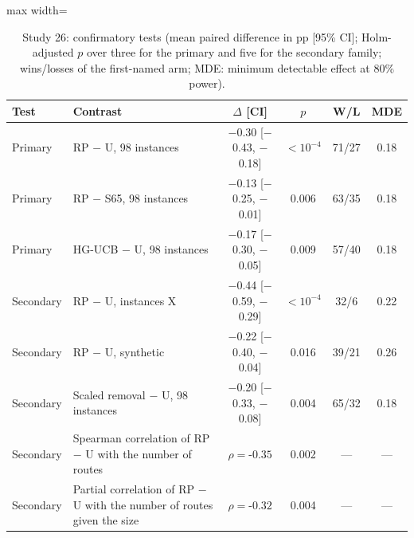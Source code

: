 \begin{table}[t]
\caption{Study 26: confirmatory tests (mean paired difference in pp [95\% CI]; Holm-adjusted $p$ over three for the primary and five for the secondary family; wins/losses of the first-named arm; MDE: minimum detectable effect at 80\% power).}\label{tab:s26f}
\centering
\small
\begin{adjustbox}{max width=\linewidth}
\begin{tabular}{llcccc}
\toprule
Test & Contrast & $\Delta$ [CI] & $p$ & W/L & MDE \\
\midrule
Primary & RP $-$ U, 98 instances & $-$0.30 [$-$0.43, $-$0.18] & \ensuremath{<10^{-4}} & 71/27 & 0.18 \\
Primary & RP $-$ S65, 98 instances & $-$0.13 [$-$0.25, $-$0.01] & 0.006 & 63/35 & 0.18 \\
Primary & HG-UCB $-$ U, 98 instances & $-$0.17 [$-$0.30, $-$0.05] & 0.009 & 57/40 & 0.18 \\
Secondary & RP $-$ U, instances X & $-$0.44 [$-$0.59, $-$0.29] & \ensuremath{<10^{-4}} & 32/6 & 0.22 \\
Secondary & RP $-$ U, synthetic & $-$0.22 [$-$0.40, $-$0.04] & 0.016 & 39/21 & 0.26 \\
Secondary & Scaled removal $-$ U, 98 instances & $-$0.20 [$-$0.33, $-$0.08] & 0.004 & 65/32 & 0.18 \\
Secondary & Spearman correlation of RP $-$ U with the number of routes & $\rho=$-$0.35$ & 0.002 & --- & --- \\
Secondary & Partial correlation of RP $-$ U with the number of routes given the size & $\rho=$-$0.32$ & 0.004 & --- & --- \\
\bottomrule
\end{tabular}
\end{adjustbox}
\end{table}
